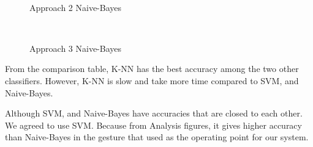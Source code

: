 \begin{figure}[h]
\begin{dBox}
\centering
 \mbox{
  }
  \caption{Approach 2 Naive-Bayes\label{fig:apr2_bayes} }
  
\end{dBox}   
\end{figure}
\begin{figure}[h]
\begin{dBox}
\centering
 \mbox{
  }
  \caption{Approach 3 Naive-Bayes\label{fig:apr3_bayes} } 
\end{dBox}   
\end{figure}

From the comparison table, K-NN has the best accuracy among the two other classifiers. However, K-NN is slow and take more time compared to SVM, and Naive-Bayes.
\bigskip

Although SVM, and Naive-Bayes have accuracies that are closed to each other. We agreed to use SVM. Because from Analysis figures, it gives higher accuracy than Naive-Bayes in the gesture that used as the operating point for our system.
\bigskip

